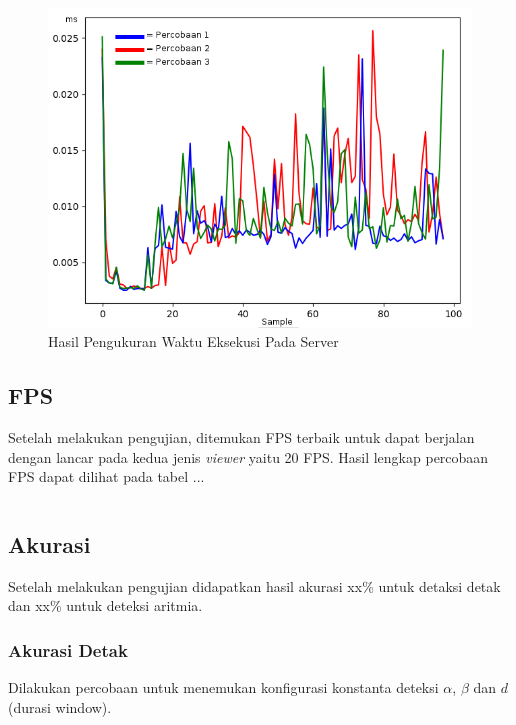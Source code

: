 \begin{figure}[H]
	\centering
	\includegraphics[scale=0.5]{images/exec_time2.png}
	\caption{Hasil Pengukuran Waktu Eksekusi Pada Server}
	\label{fig:exec_time2}
\end{figure}

\subsection{FPS}
Setelah melakukan pengujian, ditemukan FPS terbaik untuk dapat berjalan dengan lancar pada kedua jenis \textit{viewer} yaitu 20 FPS. Hasil lengkap percobaan FPS dapat dilihat pada tabel ...

\begin{table}[H]
	\centering
	\begin{tabular}{|l|l|l|l|}
	
	\end{tabular}
\end{table}

\subsection{Akurasi}
Setelah melakukan pengujian didapatkan hasil akurasi xx\% untuk detaksi detak dan xx\% untuk deteksi aritmia.
\subsubsection{Akurasi Detak}
Dilakukan percobaan untuk menemukan konfigurasi konstanta deteksi $\alpha$, $\beta$ dan $d$ (durasi window).

